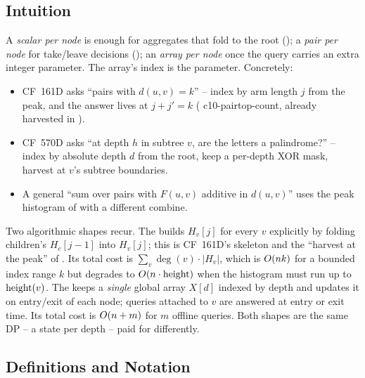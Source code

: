 \subsection{Intuition}

A \emph{scalar per node} is enough for aggregates that fold to the root
(); a \emph{pair per node} for take/leave decisions
(); an \emph{array per node} once the query carries
an extra integer parameter. The array's index is the parameter. Concretely:

\begin{itemize}[nosep]
  \item CF~161D asks ``pairs with $d(u,v)=k$'' -- index by arm length $j$
        from the peak, and the answer lives at $j + j' = k$ (\thmref
        {c10-pairtop-count}, already harvested in ).
  \item CF~570D asks ``at depth $h$ in subtree $v$, are the letters a
        palindrome?'' -- index by absolute depth $d$ from the root, keep
        a per-depth XOR mask, harvest at $v$'s subtree boundaries.
  \item A general ``sum over pairs with $F(u,v)$ additive in $d(u,v)$''
        uses the peak histogram of  with a
        different $\mathrm{combine}$.
\end{itemize}

Two algorithmic shapes recur. The 
builds $\mathit{H}_v[j]$ for every $v$ explicitly by folding children's
$\mathit{H}_c[j-1]$ into $\mathit{H}_v[j]$; this is CF~161D's skeleton
and the ``harvest at the peak'' of . Its total cost
is $\sum_v \deg(v)\cdot|\mathit{H}_v|$, which is $O(nk)$ for a
bounded index range $k$ but degrades to $O(n\cdot\operatorname{height})$ when the
histogram must run up to $\operatorname{height}(v)$. The  keeps a \emph{single} global array $\mathit{X}[d]$ indexed
by depth and updates it on entry/exit of each node; queries attached to
$v$ are answered at entry or exit time. Its total cost is $O(n+m)$
for $m$ offline queries. Both shapes are the same DP -- a state per
depth -- paid for differently.

\subsection{Definitions and Notation}

